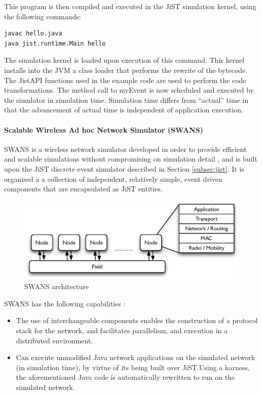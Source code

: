 This program is then compiled and executed in the JiST simulation
kernel, using the following commands:

  
\begin{lstlisting}[frame=trbl, basewidth={0.55em, 0.6em}, captionpos=b, 
basicstyle=\ttfamily\footnotesize, breaklines, caption = Execution of the
program in the JiST, label = listing:JiST ]  
javac hello.java
java jist.runtime.Main hello
\end{lstlisting}


The simulation kernel is loaded upon execution of this command. This kernel
installs into the JVM a class loader that performs the rewrite of the bytecode.
The JistAPI functions used in the example code are used to perform the
code transformations. The method call to myEvent is now scheduled and executed
by the simulator in simulation time. Simulation time differs from ``actual''
time in that the advancement of actual time is independent of application
execution. 
 
\paragraph{Scalable Wireless Ad hoc Network Simulator (SWANS)}
SWANS is a wireless network simulator developed in order to provide efficient
and scalable simulations without compromising on simulation detail \cite{barr_SWANS},
and is built upon the JiST discrete event simulator described in Section \ref{subsec:jist}. 
It is organised a a collection of independent, relatively simple, event driven
components that are encapsulated as JiST entities. 

\begin{figure}[h]
\centering
\includegraphics[width=\textwidth]{img/SWANS_architecture.eps} 
\caption[SWANS architecture]{SWANS architecture}
\label{Fig:SWANS_architecture}
\end{figure} 
  
SWANS has the following capabilities \cite{barr_SWANS}:

\begin{itemize}
\item The use of
interchangeable components enables the construction of a protocol stack for the
network, and facilitates parallelism, and execution in a distributed environment.
\item Can execute unmodified Java network applications on the
simulated network (in simulation time), by virtue of its being built over
JiST.Using a harness, the aforementioned Java code is automatically rewritten to
run on the simulated network.  
\end{itemize}
   
